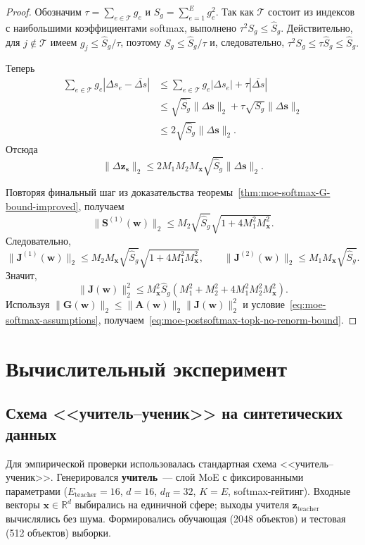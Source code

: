 \documentclass[11pt]{extarticle}
\theoremstyle{definition}
\theoremstyle{plain}
\theoremstyle{remark}
\begin{document}
\begin{proof}
Обозначим
$
\tau=\sum\limits_{e\in\mathcal T}g_e
$
и
$
S_g=\sum\limits_{e=1}^{E}g_e^2.
$
Так как $\mathcal T$ состоит из индексов с наибольшими коэффициентами softmax, выполнено
$
\tau^2S_g\le \hat S_g.
$
Действительно, для $j\notin\mathcal T$ имеем
$
g_j\le \hat S_g/\tau
$,
поэтому
$
S_g\le \hat S_g/\tau
$
и, следовательно,
$
\tau^2S_g\le \tau\hat S_g\le \hat S_g.
$

Теперь
$$
\begin{aligned}
\sum\limits_{e\in\mathcal T}
g_e
\left|
\Delta s_e-\overline{\Delta s}
\right|
&\le
\sum\limits_{e\in\mathcal T}
g_e|\Delta s_e|
+
\tau|\overline{\Delta s}| \\
&\le
\sqrt{\hat S_g}\|\Delta\mathbf s\|_2
+
\tau\sqrt{S_g}\|\Delta\mathbf s\|_2 \\
&\le
2\sqrt{\hat S_g}\|\Delta\mathbf s\|_2.
\end{aligned}
$$
Отсюда
$$
\|\Delta\mathbf z_{\mathbf s}\|_2
\le
2M_1M_2M_{\mathbf x}
\sqrt{\hat S_g}\|\Delta\mathbf s\|_2.
$$

Повторяя финальный шаг из доказательства теоремы~\ref{thm:moe-softmax-G-bound-improved}, получаем
$$
\|\mathbf S^{(1)}(\mathbf w)\|_2
\le
M_2\sqrt{\hat S_g}
\sqrt{1+4M_1^2M_{\mathbf x}^2}.
$$
Следовательно,
$$
\|\mathbf J^{(1)}(\mathbf w)\|_2
\le
M_2M_{\mathbf x}\sqrt{\hat S_g}
\sqrt{1+4M_1^2M_{\mathbf x}^2},
\qquad
\|\mathbf J^{(2)}(\mathbf w)\|_2
\le
M_1M_{\mathbf x}\sqrt{\hat S_g}.
$$
Значит,
$$
\|\mathbf J(\mathbf w)\|_2^2
\le
M_{\mathbf x}^2\hat S_g
\left(
M_1^2+M_2^2+4M_1^2M_2^2M_{\mathbf x}^2
\right).
$$
Используя
$
\|\mathbf G(\mathbf w)\|_2
\le
\|\mathbf A(\mathbf w)\|_2\|\mathbf J(\mathbf w)\|_2^2
$
и условие~\eqref{eq:moe-softmax-assumptions}, получаем~\eqref{eq:moe-postsoftmax-topk-no-renorm-bound}.
\end{proof}

\section{Вычислительный эксперимент}

\subsection{Схема <<учитель--ученик>> на синтетических данных}

Для эмпирической проверки использовалась стандартная схема <<учитель--ученик>>.
Генерировался \textbf{учитель}~--- слой MoE с фиксированными параметрами
($E_{\text{teacher}}=16$, $d=16$, $d_{\text{ff}}=32$, $K=E$,
softmax-гейтинг).
Входные векторы $\mathbf{x}\in\mathbb{R}^d$ выбирались на единичной сфере;
выходы учителя $\mathbf{z}_{\text{teacher}}$ вычислялись без шума.
Формировались обучающая (2048 объектов) и тестовая (512 объектов) выборки.
\end{document}
